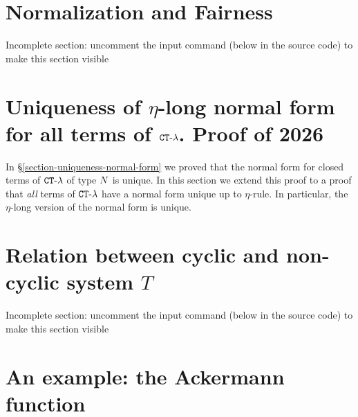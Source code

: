 \documentclass{article}
\begin{document}
\section{Normalization and Fairness}
\label{section-normalization-fairness}
{Incomplete section: uncomment the input command (below in the source code) to make this section visible}



\section{Uniqueness of $\eta$-long normal form for all terms of ${ {\tt CT}\mbox{-}\lambda}$. Proof of 2026}
\label{section-uniqueness-long-normal-form}
{In \S \ref{section-uniqueness-normal-form} we proved that the normal form for closed terms of ${ {\tt CT}\mbox{-}\lambda}$ of type ${N}$ is unique. In this section we extend this proof to a proof that \emph{all} terms of ${ {\tt CT}\mbox{-}\lambda}$ have a normal form unique up to $\eta$-rule. In particular, the $\eta$-long version of the normal form is unique.}


\section{Relation between cyclic and non-cyclic system $T$} 
\label{section-equivalence-cyclic-non-cyclic-T}
{Incomplete section: uncomment the input command (below in the source code) to make this section visible}


\section{An example: the Ackermann function} 
\label{section-ackermann}

\end{document}
